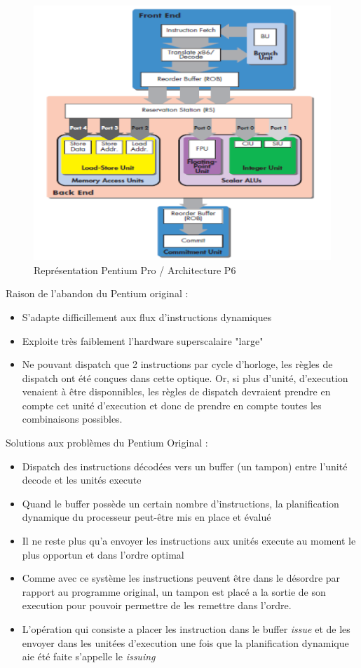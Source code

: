 \documentclass[a4paper]{article}
\begin{document}
  \begin{figure}[H]
    \centering
    \includegraphics[width = 0.5 \textwidth]{images/11.PNG}
    \caption{Représentation Pentium Pro / Architecture P6}
  \end{figure}
\newpage
  Raison de l'abandon du Pentium original :
  \begin{itemize}
    \item S'adapte difficillement aux flux d'instructions dynamiques
    \item Exploite très faiblement l'hardware superscalaire "large"
    \item Ne pouvant dispatch que 2 instructions par cycle d’horloge, les règles de dispatch ont été conçues dans cette optique. Or, si plus d'unité, d'execution venaient à être disponnibles,
    les règles de dispatch devraient prendre en compte cet unité d'execution et donc de prendre en compte toutes les combinaisons possibles.
  \end{itemize}

  Solutions aux problèmes du Pentium Original :
  \begin{itemize}
    \item Dispatch des instructions décodées vers un buffer (un tampon) entre l'unité decode et les unités execute
    \item Quand le buffer possède un certain nombre d'instructions, la planification dynamique du processeur peut-être mis en place et évalué
    \item Il ne reste plus qu'a envoyer les instructions aux unités execute au moment le plus opportun et dans l'ordre optimal
    \item Comme avec ce système les instructions peuvent être dans le désordre par rapport au programme original, un tampon est placé a la sortie de son execution pour pouvoir
    permettre de les remettre dans l'ordre.
    \item L'opération qui consiste a placer les instruction dans le buffer \emph{issue} et de les envoyer dans les unitées d'execution une fois 
     que la planification dynamique aie été faite s'appelle le \emph{issuing}
  \end{itemize}
\end{document}
